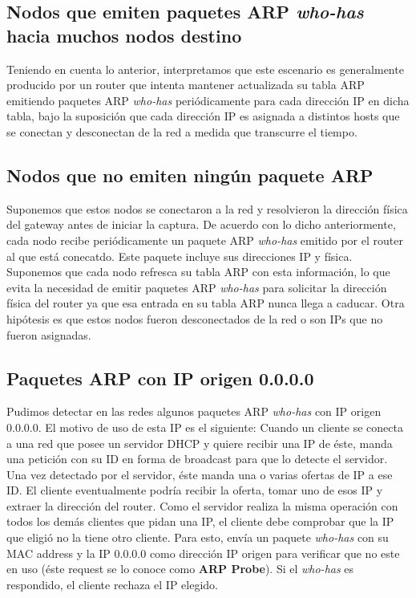 \documentclass[10pt, a4paper]{article}
\begin{document}
\subsection{Nodos que emiten paquetes ARP \textit{who-has} hacia muchos nodos destino}

Teniendo en cuenta lo anterior, interpretamos que este escenario es generalmente producido por un router que intenta mantener actualizada su tabla ARP emitiendo paquetes ARP \textit{who-has} periódicamente para cada dirección IP en dicha tabla, bajo la suposición que cada dirección IP es asignada a distintos hosts que se conectan y desconectan de la red a medida que transcurre el tiempo.


\subsection{Nodos que no emiten ningún paquete ARP}

Suponemos que estos nodos se conectaron a la red y resolvieron la dirección física del gateway antes de iniciar la captura. De acuerdo con lo dicho anteriormente, cada nodo recibe periódicamente un paquete ARP \textit{who-has} emitido por el router al que está conecatdo. Este paquete incluye sus direcciones IP y física. Suponemos que cada nodo refresca su tabla ARP con esta información, lo que evita la necesidad de emitir paquetes ARP \textit{who-has} para solicitar la dirección física del router ya que esa entrada en su tabla ARP nunca llega a caducar.
Otra hipótesis es que estos nodos fueron desconectados de la red o son IPs que no fueron asignadas.

\subsection{Paquetes ARP con IP origen 0.0.0.0}

Pudimos detectar en las redes algunos paquetes ARP \textit{who-has} con IP origen 0.0.0.0.
El motivo de uso de esta IP es el siguiente:
Cuando un cliente se conecta a una red que posee un servidor DHCP y quiere recibir una IP de éste, manda una petición con su ID en forma de broadcast para que lo detecte el servidor. Una vez detectado por el servidor, éste manda una o varias ofertas de IP a ese ID.
El cliente eventualmente podría recibir la oferta, tomar uno de esos IP y extraer la dirección del router.
Como el servidor realiza la misma operación con todos los demás clientes que pidan una IP, el cliente debe comprobar que la IP que eligió no la tiene otro cliente. Para esto, envía un paquete \textit{who-has} con su MAC address y la IP 0.0.0.0 como dirección IP origen para verificar que no este en uso (éste request se lo conoce como \textbf{ARP Probe}). Si el \textit{who-has} es respondido, el cliente rechaza el IP elegido.
\end{document}

